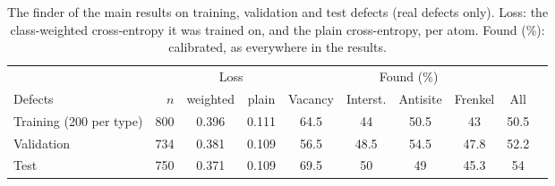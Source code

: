 \begin{table}[tb]
\centering
\caption{The finder of the main results on training, validation and test defects (real defects only). Loss: the class-weighted cross-entropy it was trained on, and the plain cross-entropy, per atom. Found (\%): calibrated, as everywhere in the results.}
\label{tab:splits}
\footnotesize\setlength{\tabcolsep}{4pt}
\begin{tabular}{@{}lrcccccccc@{}}
\toprule
 & & \multicolumn{2}{c}{Loss} & \multicolumn{5}{c}{Found (\%)} \\
\cmidrule(lr){3-4}\cmidrule(l){5-9}
Defects & $n$ & weighted & plain & Vacancy & Interst. & Antisite & Frenkel & All \\
\midrule
Training (200 per type) & 800 & 0.396 & 0.111 & 64.5 & 44 & 50.5 & 43 & 50.5 \\
Validation & 734 & 0.381 & 0.109 & 56.5 & 48.5 & 54.5 & 47.8 & 52.2 \\
Test & 750 & 0.371 & 0.109 & 69.5 & 50 & 49 & 45.3 & 54 \\
\bottomrule
\end{tabular}
\end{table}
